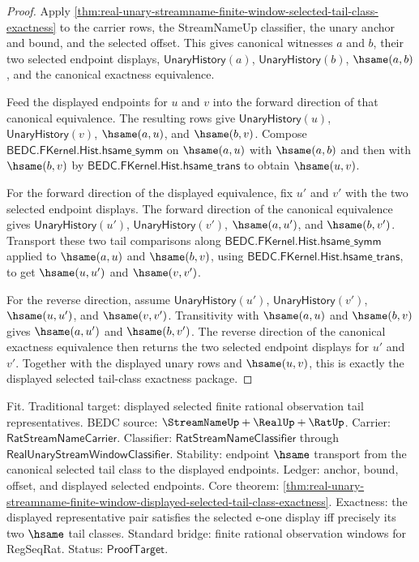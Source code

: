 \begin{proof}
Apply
\autoref{thm:real-unary-streamname-finite-window-selected-tail-class-exactness}
to the carrier rows, the StreamNameUp classifier, the unary anchor and bound,
and the selected offset. This gives canonical witnesses $a$ and $b$, their two
selected endpoint displays, $\mathsf{UnaryHistory}(a)$,
$\mathsf{UnaryHistory}(b)$, $\hsame(a,b)$, and the canonical exactness
equivalence.

Feed the displayed endpoints for $u$ and $v$ into the forward direction of that
canonical equivalence. The resulting rows give $\mathsf{UnaryHistory}(u)$,
$\mathsf{UnaryHistory}(v)$, $\hsame(a,u)$, and $\hsame(b,v)$. Compose
$\mathsf{BEDC.FKernel.Hist.hsame\_symm}$ on $\hsame(a,u)$ with
$\hsame(a,b)$ and then with $\hsame(b,v)$ by
$\mathsf{BEDC.FKernel.Hist.hsame\_trans}$ to obtain $\hsame(u,v)$.

For the forward direction of the displayed equivalence, fix $u'$ and $v'$ with
the two selected endpoint displays. The forward direction of the canonical
equivalence gives $\mathsf{UnaryHistory}(u')$, $\mathsf{UnaryHistory}(v')$,
$\hsame(a,u')$, and $\hsame(b,v')$. Transport these two tail comparisons along
$\mathsf{BEDC.FKernel.Hist.hsame\_symm}$ applied to $\hsame(a,u)$ and
$\hsame(b,v)$, using $\mathsf{BEDC.FKernel.Hist.hsame\_trans}$, to get
$\hsame(u,u')$ and $\hsame(v,v')$.

For the reverse direction, assume $\mathsf{UnaryHistory}(u')$,
$\mathsf{UnaryHistory}(v')$, $\hsame(u,u')$, and $\hsame(v,v')$. Transitivity
with $\hsame(a,u)$ and $\hsame(b,v)$ gives $\hsame(a,u')$ and $\hsame(b,v')$.
The reverse direction of the canonical exactness equivalence then returns the
two selected endpoint displays for $u'$ and $v'$. Together with the displayed
unary rows and $\hsame(u,v)$, this is exactly the displayed selected tail-class
exactness package.
\end{proof}

Fit. Traditional target: displayed selected finite rational observation tail
representatives. BEDC source: $\StreamNameUp+\RealUp+\RatUp$. Carrier:
$\mathsf{RatStreamNameCarrier}$. Classifier:
$\mathsf{RatStreamNameClassifier}$ through
$\mathsf{RealUnaryStreamWindowClassifier}$. Stability: endpoint $\hsame$
transport from the canonical selected tail class to the displayed endpoints.
Ledger: anchor, bound, offset, and displayed selected endpoints. Core theorem:
\autoref{thm:real-unary-streamname-finite-window-displayed-selected-tail-class-exactness}.
Exactness: the displayed representative pair satisfies the selected e-one
display iff precisely its two $\hsame$ tail classes. Standard bridge: finite
rational observation windows for RegSeqRat. Status: $\mathsf{ProofTarget}$.
